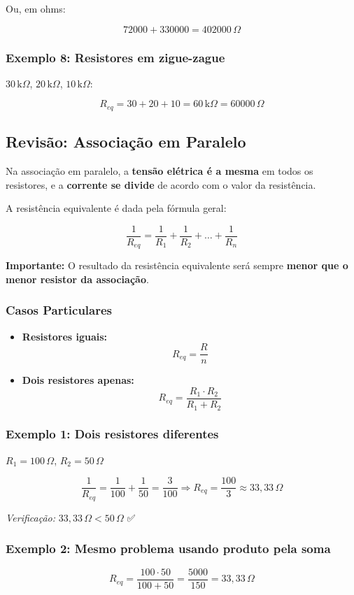 Ou, em ohms:

\[
72000 + 330000 = 402000\,\Omega
\]

\subsubsection{Exemplo 8: Resistores em zigue-zague}
$30\,\text{k}\Omega$, $20\,\text{k}\Omega$, $10\,\text{k}\Omega$:

\[
R_{eq} = 30 + 20 + 10 = 60\,\text{k}\Omega = 60000\,\Omega
\]

\subsection{Revisão: Associação em Paralelo}
Na associação em paralelo, a \textbf{tensão elétrica é a mesma} em todos os resistores, e a \textbf{corrente se divide} de acordo com o valor da resistência.

A resistência equivalente é dada pela fórmula geral:

\[
\frac{1}{R_{eq}} = \frac{1}{R_1} + \frac{1}{R_2} + \dots + \frac{1}{R_n}
\]

\textbf{Importante:} O resultado da resistência equivalente será sempre \textbf{menor que o menor resistor da associação}.

\subsubsection{Casos Particulares}
\begin{itemize}
    \item \textbf{Resistores iguais:}
    \[
    R_{eq} = \frac{R}{n}
    \]

    \item \textbf{Dois resistores apenas:}
    \[
    R_{eq} = \frac{R_1 \cdot R_2}{R_1 + R_2}
    \]
\end{itemize}

\subsubsection{Exemplo 1: Dois resistores diferentes}
$R_1 = 100\,\Omega$, $R_2 = 50\,\Omega$

\[
\frac{1}{R_{eq}} = \frac{1}{100} + \frac{1}{50} = \frac{3}{100}
\Rightarrow
R_{eq} = \frac{100}{3} \approx 33{,}33\,\Omega
\]

\textit{Verificação:} $33{,}33\,\Omega < 50\,\Omega$ ✅

\subsubsection{Exemplo 2: Mesmo problema usando produto pela soma}
\[
R_{eq} = \frac{100 \cdot 50}{100 + 50} = \frac{5000}{150} = 33{,}33\,\Omega
\]

